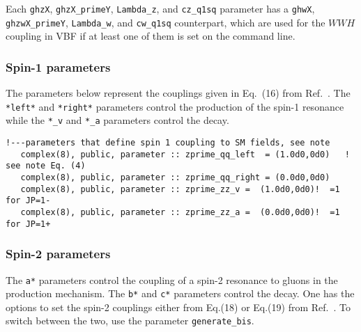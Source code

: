 \documentclass[aps,superscriptaddress,nofootinbib]{revtex4}
\begin{document}
Each \verb|ghzX|, \verb|ghzX_primeY|, \verb|Lambda_z|, and \verb|cz_q1sq| parameter has a \verb|ghwX|, \verb|ghzwX_primeY|, \verb|Lambda_w|, and \verb|cw_q1sq| counterpart, which are used for the $WWH$ coupling in VBF if at least one of them is set on the command line.



\subsubsection{ Spin-1 parameters }
\label{spin1}

The parameters below represent the couplings given in Eq.~(16) from Ref.~\cite{Bolognesi:2012}. The \verb|*left*| and \verb|*right*| parameters control the production of the spin-1 resonance while the \verb|*_v| and \verb|*_a| parameters control the decay.

\begin{verbatim}
!---parameters that define spin 1 coupling to SM fields, see note
   complex(8), public, parameter :: zprime_qq_left  = (1.0d0,0d0)   !  see note Eq. (4)
   complex(8), public, parameter :: zprime_qq_right = (0.0d0,0d0)
   complex(8), public, parameter :: zprime_zz_v =  (1.0d0,0d0)!  =1 for JP=1-
   complex(8), public, parameter :: zprime_zz_a =  (0.0d0,0d0)!  =1 for JP=1+
\end{verbatim}

\subsubsection{ Spin-2 parameters }
\label{spin2}

\noindent
The \verb|a*| parameters control the coupling of a spin-2 resonance to gluons in the production mechanism.  The \verb|b*| and \verb|c*| parameters control the decay.
One has the options to set the spin-2 couplings either from Eq.(18) or Eq.(19) from Ref.~\cite{Bolognesi:2012}.  To switch between the two, use the parameter \verb|generate_bis|.
\end{document}
